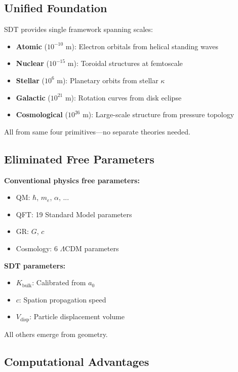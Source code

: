 \subsection{Unified Foundation}

SDT provides single framework spanning scales:

\begin{itemize}
\item \textbf{Atomic} ($10^{-10}$ m): Electron orbitals from helical standing waves
\item \textbf{Nuclear} ($10^{-15}$ m): Toroidal structures at femtoscale
\item \textbf{Stellar} ($10^{6}$ m): Planetary orbits from stellar $\kappa$
\item \textbf{Galactic} ($10^{21}$ m): Rotation curves from disk eclipse
\item \textbf{Cosmological} ($10^{26}$ m): Large-scale structure from pressure topology
\end{itemize}

All from same four primitives—no separate theories needed.

\subsection{Eliminated Free Parameters}

\textbf{Conventional physics free parameters:}

\begin{itemize}
\item QM: $\hbar$, $m_e$, $\alpha$, ...
\item QFT: 19 Standard Model parameters
\item GR: $G$, $c$
\item Cosmology: 6 $\Lambda$CDM parameters
\end{itemize}

\textbf{SDT parameters:}

\begin{itemize}
\item $K_{\text{bulk}}$: Calibrated from $a_0$
\item $c$: Spation propagation speed
\item $V_{\text{disp}}$: Particle displacement volume
\end{itemize}

All others emerge from geometry.

\subsection{Computational Advantages}

